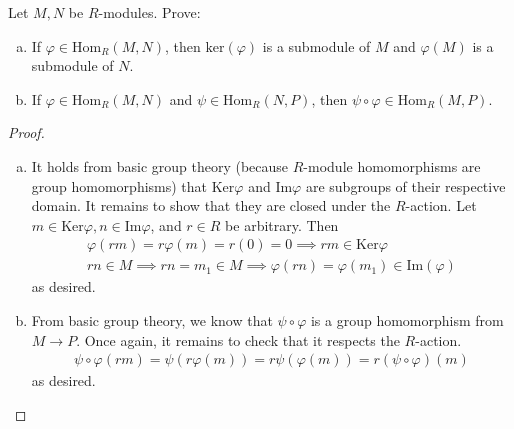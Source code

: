 \documentclass[num=2,duedate=02-10-21,course=Algebra\ II,proflastname=Walton]{hwtemplate}
\begin{document}
\problem[7]
\begin{claim}
Let \(M,N\) be \(R\)-modules. Prove:
\begin{enumerate}[(a).]
	\item If \(\varphi \in \textrm{Hom}_R(M,N)\), then \( \textrm{ker}(\varphi)\) is a submodule of \(M\) and \(\varphi(M)\) is a submodule of \(N\).
	\item If \(\varphi \in \textrm{Hom}_R(M,N)\) and \(\psi \in \textrm{Hom}_R(N,P)\), then \(\psi \circ \varphi \in \textrm{Hom}_R(M,P)\).
\end{enumerate}
\end{claim}
\begin{proof}
	\begin{enumerate}[(a).]
		\item It holds from basic group theory (because \(R\)-module homomorphisms are group homomorphisms) that \( \textrm{Ker}\varphi\) and \( \textrm{Im}\varphi \) are subgroups of their respective domain. It remains to show that they are closed under the \(R\)-action. Let \(m \in  \textrm{Ker}\varphi, n \in \textrm{Im}\varphi\), and \(r \in R\) be arbitrary. Then
			\begin{align*}
				\varphi(rm) = r\varphi(m) = r(0) = 0 \implies rm \in \textrm{Ker}\varphi\\
				rn \in M \implies rn = m_1 \in M \implies \varphi(rn) = \varphi(m_1) \in \textrm{Im}(\varphi) 
			\end{align*}
			as desired.
		\item From basic group theory, we know that \(\psi \circ \varphi \) is a group homomorphism from \(M \to P\). Once again, it remains to check that it respects the \(R\)-action.
			\begin{align*}
				\psi \circ \varphi(rm) = \psi( r\varphi(m)) = r \psi(\varphi(m)) = r(\psi \circ \varphi)(m)
			\end{align*}
			as desired.
	\end{enumerate}
\end{proof}
\end{document}
